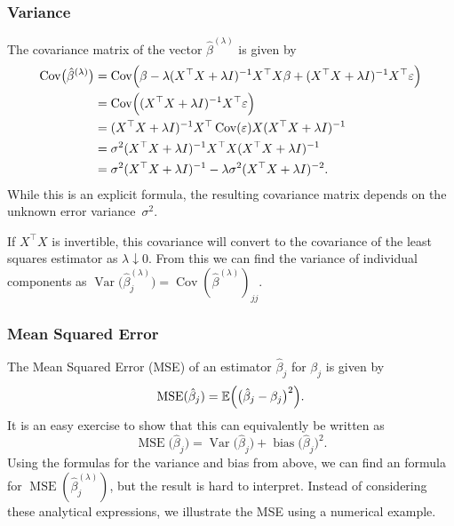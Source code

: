 \documentclass[
  a4paper,
]{article}
\theoremstyle{definition}
\theoremstyle{definition}
\theoremstyle{definition}
\theoremstyle{definition}
\theoremstyle{remark}
\begin{document}
\hypertarget{variance}{%
\subsubsection{Variance}\label{variance}}

The covariance matrix of the vector \(\hat\beta^{(\lambda)}\) is given
by
\begin{align*}
  \mathop{\mathrm{Cov}}\bigl(\hat\beta^{(\lambda)}\bigr)
  &= \mathop{\mathrm{Cov}}\Bigl(
      \beta
      - \lambda (X^\top X + \lambda I)^{-1} X^\top X \beta
      + (X^\top X + \lambda I)^{-1} X^\top \varepsilon
    \Bigr) \\
  &= \mathop{\mathrm{Cov}}\Bigl(
      (X^\top X + \lambda I)^{-1} X^\top \varepsilon
    \Bigr) \\
  &= (X^\top X + \lambda I)^{-1} X^\top \mathop{\mathrm{Cov}}(\varepsilon) X (X^\top X + \lambda I)^{-1} \\
  &= \sigma^2 (X^\top X + \lambda I)^{-1} X^\top X (X^\top X + \lambda I)^{-1} \\
  &= \sigma^2 (X^\top X + \lambda I)^{-1} - \lambda \sigma^2 (X^\top X + \lambda I)^{-2}.
\end{align*}
While this is an explicit formula, the resulting covariance matrix
depends on the unknown error variance~\(\sigma^2\).

If \(X^\top X\) is invertible, this covariance will convert to the
covariance of the least squares estimator as \(\lambda \downarrow 0\).
From this we can find the variance of individual components
as \(\mathop{\mathrm{Var}}\bigl( \hat\beta^{(\lambda)}_j \bigr) = \mathop{\mathrm{Cov}}( \hat\beta^{(\lambda)} )_{jj}\).

\hypertarget{mean-squared-error}{%
\subsubsection{Mean Squared Error}\label{mean-squared-error}}

The Mean Squared Error (MSE) of an estimator \(\hat \beta_j\) for \(\beta_j\) is
given by
\begin{equation*}
  \mathop{\mathrm{MSE}}\nolimits( \hat\beta_j )
  = \mathbb{E}\Bigl( \bigl( \hat\beta_j - \beta_j \bigr)^2 \Bigr).
\end{equation*}
It is an easy exercise to show that this can equivalently be written as
\begin{equation*}
  \mathop{\mathrm{MSE}}\nolimits\bigl( \hat\beta_j \bigr)
  = \mathop{\mathrm{Var}}\bigl( \hat\beta_j \bigr) + \mathop{\mathrm{bias}}\bigl( \hat\beta_j \bigr)^2.
\end{equation*}
Using the formulas for the variance and bias from above, we
can find an formula for \(\mathop{\mathrm{MSE}}\nolimits(\hat\beta^{(\lambda)}_j)\),
but the result is hard to interpret. Instead of considering these analytical
expressions, we illustrate the MSE using a numerical
example.
\end{document}
